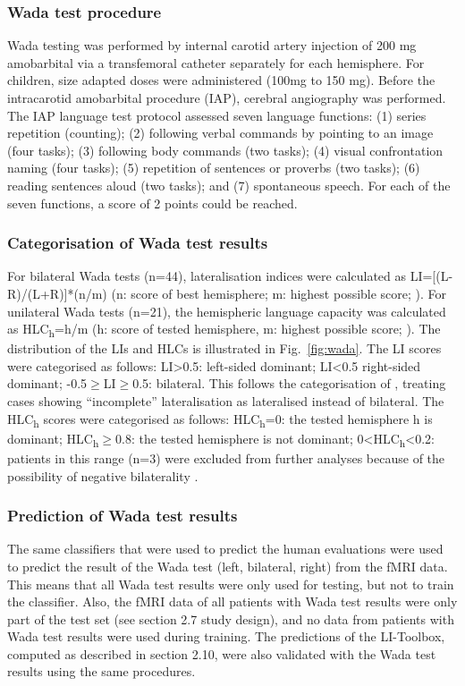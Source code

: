 \documentclass[fleqn,10pt]{SelfArx} %
\begin{document}
\subsubsection{Wada test procedure}
Wada testing was performed by internal carotid artery injection of 200 mg amobarbital via a transfemoral catheter separately for each hemisphere. For children, size adapted doses were administered (100mg to 150 mg). Before the intracarotid amobarbital procedure (IAP), cerebral angiography was performed. The IAP language test protocol assessed seven language functions: (1) series repetition (counting); (2) following verbal commands by pointing to an image (four tasks); (3) following body commands (two tasks); (4) visual confrontation naming (four tasks); (5) repetition of sentences or proverbs (two tasks); (6) reading sentences aloud (two tasks); and (7) spontaneous speech. For each of the seven functions, a score of 2 points could be reached.

\subsubsection{Categorisation of Wada test results}
For bilateral Wada tests (n=44), lateralisation indices were calculated as LI=[(L-R)/(L+R)]*(n/m) (n: score of best hemisphere; m: highest possible score; \citealt{Kurthen_1994}). For unilateral Wada tests (n=21), the hemispheric language capacity was calculated as HLC\textsubscript{h}=h/m (h: score of tested hemisphere, m: highest possible score; \citealt{Wellmer_2005}). The distribution of the LIs and HLCs is illustrated in  Fig.~\ref{fig:wada}. The LI scores were categorised as follows: LI>0.5: left-sided dominant; LI<0.5 right-sided dominant; -0.5$\geq$LI$\geq$0.5: bilateral. This follows the categorisation of \citet{Kurthen_1994}, treating cases showing “incomplete” lateralisation as lateralised instead of bilateral. The HLC\textsubscript{h} scores were categorised as follows: HLC\textsubscript{h}=0: the tested hemisphere h is dominant; HLC\textsubscript{h}$\geq$0.8: the tested hemisphere is not dominant; 0<HLC\textsubscript{h}<0.2: patients in this range (n=3) were excluded from further analyses because of the possibility of negative bilaterality \citep{Wellmer_2005}.

\subsubsection{Prediction of Wada test results}
The same classifiers that were used to predict the human evaluations were used to predict the result of the Wada test (left, bilateral, right) from the fMRI data. This means that all Wada test results were only used for testing, but not to train the classifier. Also, the fMRI data of all patients with Wada test results were only part of the test set (see section 2.7 study design), and no data from patients with Wada test results were used during training. The predictions of the LI-Toolbox, computed as described in section 2.10, were also validated with the Wada test results using the same procedures.
\end{document}
